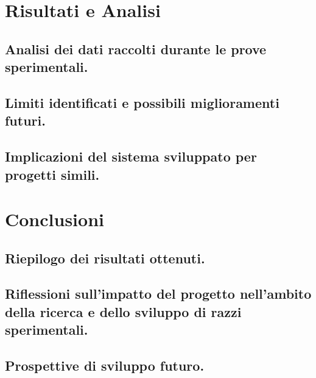 \documentclass[12pt,a4paper,twoside]{book}
\begin{document}
\chapter{Risultati e Analisi} \label{chap:results}

\section{Analisi dei dati raccolti durante le prove sperimentali.}
\section{Limiti identificati e possibili miglioramenti futuri.}
\section{Implicazioni del sistema sviluppato per progetti simili.}

\chapter{Conclusioni} \label{chap:conclusion}

\section{Riepilogo dei risultati ottenuti.}
\section{Riflessioni sull'impatto del progetto nell'ambito della ricerca e dello sviluppo di razzi sperimentali.}
\section{Prospettive di sviluppo futuro.}
\end{document}
